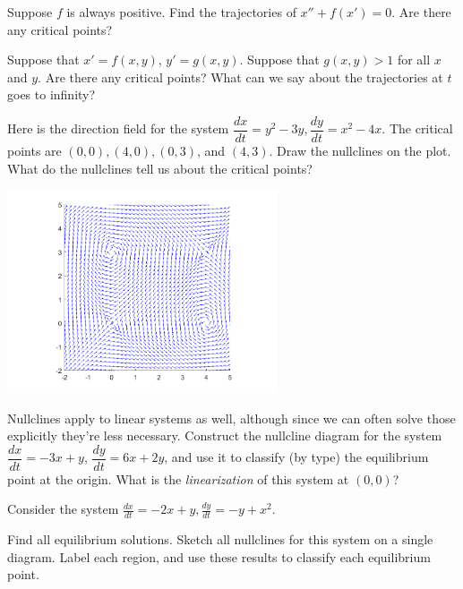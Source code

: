 \begin{exercise}
Suppose $f$ is always positive.
Find the trajectories of $x''+f(x') = 0$.
Are there any critical points?
\end{exercise}

\begin{exercise}
Suppose that $x' = f(x,y)$, $y' = g(x,y)$.  Suppose that $g(x,y) > 1$ for
all $x$ and $y$.  Are there any critical points?  What can we say about the
trajectories at $t$ goes to infinity?
\end{exercise}

\begin{exercise}
Here is the direction field for the system $\dfrac{dx}{dt}=y^2-3y, \dfrac{dy}{dt}=x^2-4x$. The critical points are $(0,0), (4,0), (0,3)$, and $(4,3)$. Draw the nullclines on the plot. What do the nullclines tell us about the critical points?

\begin{center}
\includegraphics[width=0.6\textwidth]{Images/NLVF_1.png}
\end{center}
\end{exercise}

\begin{exercise}
Nullclines apply to linear systems as well, although since we can often solve those explicitly they're less necessary. Construct the nullcline diagram for the system $\dfrac{dx}{dt}=-3x+y$, $\dfrac{dy}{dt}=6x+2y$, and use it to classify (by type) the equilibrium point at the origin. What is the {\it linearization} of this system at $(0,0)$?
\end{exercise}

\begin{exercise}
Consider the system $\displaystyle \frac{dx}{dt}= -2x+y, \frac{dy}{dt}=-y+x^2$.
\begin{tasks}
\task Find all equilibrium solutions.
\task Sketch all nullclines for this system on a single diagram. Label each region, and use these results to classify each equilibrium point.
\end{tasks}
\end{exercise}

